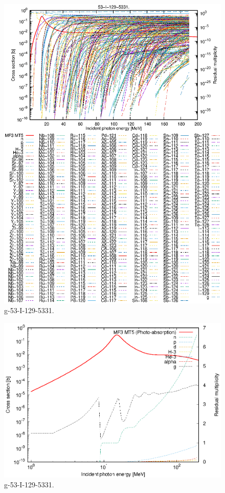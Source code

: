 \begin{figure}
 \includegraphics[width=\linewidth]{eps/g_53-I-129_5331.eps}
  \caption{g-53-I-129-5331.}
\end{figure}
\newpage \clearpage

\begin{figure}
 \includegraphics[width=\linewidth]{eps-log/g_53-I-129_5331.eps}
 \caption{g-53-I-129-5331.}
\end{figure}
\newpage \clearpage

